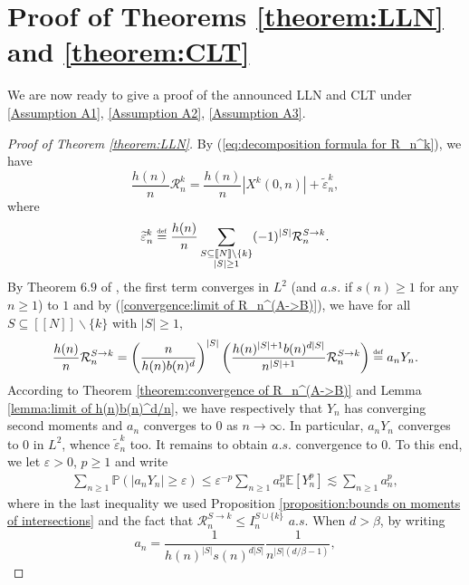 \documentclass[10pt,a4paper]{amsart}
\newcommand{\R}{\mathcal R}
\newcommand{\EE}{\mathbb E}
\newcommand{\PP}{\mathbb P}
\newcommand{\1}{\mathds{1}}
\newcommand{\eqdef}{\stackrel{\scaleto{\mathrm{def}}{3.5pt}}{=}}
\numberwithin{equation}{section}
\begin{document}
\section{Proof of Theorems \ref{theorem:LLN} and \ref{theorem:CLT}}
\label{section:proof of main results}

We are now ready to give a proof of the announced LLN and CLT under \ref{Assumption A1}, \ref{Assumption A2}, \ref{Assumption A3}. 
\begin{proof}[Proof of Theorem \ref{theorem:LLN}]
    By (\ref{eq:decomposition formula for R_n^k}), we have
\begin{equation*}
    \frac{h(n)}n\R_n^k=\frac{h(n)}n \left|X^k(0,n)\right|+\widetilde\varepsilon_n^k,
\end{equation*}
where 
\begin{equation*}
    \widetilde\varepsilon_n^k\eqdef\frac{h(n)}n\sum_{\substack{S\subseteq[\![N]\!]\backslash\{k\} \\ |S|\ge 1}}(-1)^{|S|}\R_n^{S\rightarrow k}.
\end{equation*}
By Theorem $6.9$ of \cite{LeGallRosenRangeOfStableRandomWalks1991}, the first term converges in $L^2$ (and $a.s.$ if $s(n)\ge1$ for any $n\ge1$) to $1$ and by (\ref{convergence:limit of R_n^(A->B)}), we have for all $S\subseteq[\![N]\!]\backslash\{k\}$ with $|S|\ge1$,
\begin{equation*}
    \frac{h(n)}{n}\R_n^{S\rightarrow k}=\left(\frac{n}{h(n)b(n)^d}\right)^{|S|}\left(\frac{h(n)^{|S|+1}b(n)^{d|S|}}{n^{|S|+1}}\R_n^{S\rightarrow k}\right)\eqdef a_nY_n.
\end{equation*}
According to Theorem \ref{theorem:convergence of R_n^(A->B)} and Lemma \ref{lemma:limit of h(n)b(n)^d/n}, we have respectively that $Y_n$ has converging second moments and $a_n$ converges to $0$ as $n\rightarrow\infty$. In particular, $a_nY_n$ converges to $0$ in $L^2$, whence $\widetilde\varepsilon_n^k$ too. It remains to obtain $a.s.$ convergence to $0$. To this end, we let $\varepsilon>0$, $p\ge1$ and write
\begin{align*}
    \sum_{n\ge1}\PP\left(|a_n Y_n|\ge\varepsilon\right)\le \varepsilon^{-p}\sum_{n\ge1}a_n^p\EE[Y_n^p]\lesssim\sum_{n\ge1}a_n^p,
\end{align*}
where in the last inequality we used Proposition \ref{proposition:bounds on moments of intersections} and the fact that $\R_n^{S\rightarrow k}\le I_n^{S\cup\{k\}}$ $a.s.$ When $d>\beta$, by writing 
\begin{equation*}
    a_n=\frac{1}{h(n)^{|S|}s(n)^{d|S|}}\frac{1}{n^{|S|(d/\beta-1)}},

\end{equation*}
\end{proof}
\end{document}
